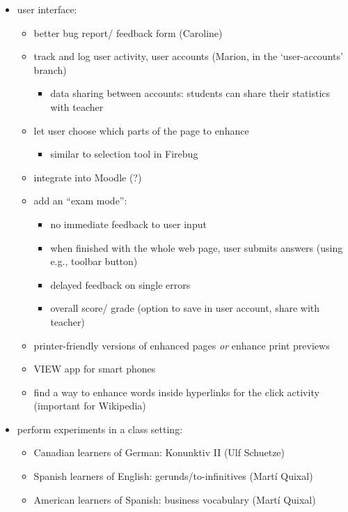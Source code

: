 \documentclass{article}
\begin{document}
\begin{itemize}
\begin{itemize}
	\end{itemize}
\item user interface:
	\begin{itemize}
	\item better bug report/ feedback form (Caroline)
	\item track and log user activity, user accounts (Marion, in the `user-accounts' branch)
		\begin{itemize}
		\item data sharing between accounts: students can share their statistics with teacher
		\end{itemize}
	\item let user choose which parts of the page to enhance
		\begin{itemize}
		\item similar to selection tool in Firebug
		\end{itemize}
	\item integrate into Moodle (?)
	\item add an ``exam mode'':
		\begin{itemize}
		\item no immediate feedback to user input
		\item when finished with the whole web page, user submits answers (using e.g., toolbar button)
		\item delayed feedback on single errors
		\item overall score/ grade (option to save in user account, share with teacher)
		\end{itemize}
	\item printer-friendly versions of enhanced pages \textit{or} enhance print previews
	\item VIEW app for smart phones
	\item find a way to enhance words inside hyperlinks for the click activity (important for Wikipedia)
	\end{itemize}
\item perform experiments in a class setting:
	\begin{itemize}
	\item Canadian learners of German: Konunktiv II (Ulf Schuetze)
	\item Spanish learners of English: gerunds/to-infinitives (Martí Quixal)
	\item American learners of Spanish: business vocabulary (Martí Quixal)
	\end{itemize}
\end{itemize}
\end{document}
